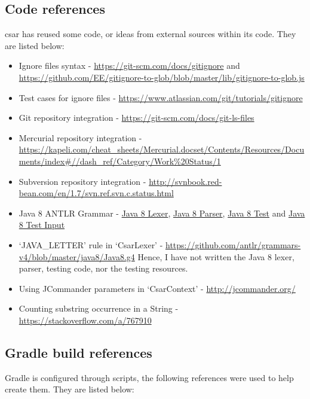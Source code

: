 \documentclass[12pt, letterpaper]{article}
\begin{document}
\subsection{Code references}
csar has reused some code, or ideas from external sources within its code. They are listed below:
\begin{itemize}
  \item Ignore files syntax - \url{https://git-scm.com/docs/gitignore} and \url{https://github.com/EE/gitignore-to-glob/blob/master/lib/gitignore-to-glob.js}
  \item Test cases for ignore files - \url{https://www.atlassian.com/git/tutorials/gitignore}
  \item Git repository integration - \url{https://git-scm.com/docs/git-ls-files}
  \item Mercurial repository integration - \url{https://kapeli.com/cheat_sheets/Mercurial.docset/Contents/Resources/Documents/index#//dash_ref/Category/Work%20Status/1}
  \item Subversion repository integration - \url{http://svnbook.red-bean.com/en/1.7/svn.ref.svn.c.status.html}
  \item Java 8 ANTLR Grammar - \href{https://github.com/antlr/grammars-v4/blob/02711067f82bed8e0c8dfd25e80f4f8ae2472abd/java8-pt/JavaLexer.g4}{Java 8 Lexer}, \href{https://github.com/antlr/grammars-v4/blob/02711067f82bed8e0c8dfd25e80f4f8ae2472abd/java8-pt/JavaParser.g4}{Java 8 Parser}, \href{https://github.com/antlr/grammars-v4/blob/02711067f82bed8e0c8dfd25e80f4f8ae2472abd/_grammar-test/src/test/java/TestJava8pt.java}{Java 8 Test} and \href{https://github.com/antlr/grammars-v4/blob/02711067f82bed8e0c8dfd25e80f4f8ae2472abd/java8-pt/examples/AllInOne8.java}{Java 8 Test Input}
  \item `JAVA\_LETTER' rule in `CsarLexer' - \url{https://github.com/antlr/grammars-v4/blob/master/java8/Java8.g4}
  Hence, I have not written the Java 8 lexer, parser, testing code, nor the testing resources.
  \item Using JCommander parameters in `CsarContext' - \url{http://jcommander.org/}
  \item Counting substring occurrence in a String - \url{https://stackoverflow.com/a/767910}
\end{itemize}

\subsection{Gradle build references}
Gradle is configured through scripts, the following references were used to help create them. They are listed below:
\end{document}
